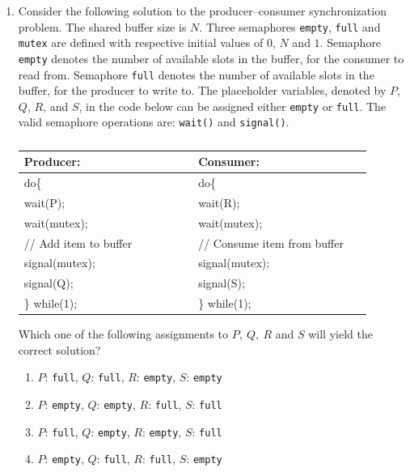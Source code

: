 \documentclass[12pt]{article}
\begin{document}
\begin{enumerate}
(GATE CS 2018)

\item Consider the following solution to the producer–consumer synchronization problem. The
shared buffer size is $N$. Three semaphores \texttt{empty}, \texttt{full} and \texttt{mutex} are defined with respective
initial values of $0$, $N$ and $1$. Semaphore \texttt{empty} denotes the number of available slots in the
buffer, for the consumer to read from. Semaphore \texttt{full} denotes the number of available slots
in the buffer, for the producer to write to. The placeholder variables, denoted by $P$, $Q$, $R$,
and $S$, in the code below can be assigned either \texttt{empty} or \texttt{full}. The valid semaphore
operations are: \texttt{wait()} and \texttt{signal()}.

\begin{table}[H]
\centering
\caption{} \label{}
\begin{tabular}{|p{0.45\linewidth}|p{0.45\linewidth}|}
\hline
\textbf{Producer:} &
\textbf{Consumer:} \\
\hline
\ttfamily
do\{ & do\{\\
\quad wait(P); & \quad wait(R);\\
\quad wait(mutex); & \quad wait(mutex);\\
\quad // Add item to buffer & \quad // Consume item from buffer\\
\quad signal(mutex); & \quad signal(mutex);\\
\quad signal(Q); & \quad signal(S);\\
\} while(1); &  \} while(1);\\

\hline
\end{tabular}
\end{table}

Which one of the following assignments to $P,\ Q,\ R$ and $S$ will yield the correct solution?

\begin{enumerate}
\item $P$: \texttt{full}, \quad $Q$: \texttt{full}, \quad $R$: \texttt{empty}, \quad $S$: \texttt{empty}
\item $P$: \texttt{empty}, \quad $Q$: \texttt{empty}, \quad $R$: \texttt{full}, \quad $S$: \texttt{full}
\item $P$: \texttt{full}, \quad $Q$: \texttt{empty}, \quad $R$: \texttt{empty}, \quad $S$: \texttt{full}
\item $P$: \texttt{empty}, \quad $Q$: \texttt{full}, \quad $R$: \texttt{full}, \quad $S$: \texttt{empty}
\end{enumerate}



\end{enumerate}
\end{document}
